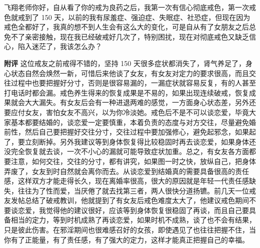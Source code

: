 \begin{case}
    飞翔老师你好，自从看了你的戒为良药之后，我第一次有信心彻底戒色，第一次戒色就戒到了 150 天，以前的我有尿羞症、强迫症、失眠症、社恐症，但现在因为戒色全都好了，我真的想不到人生会有这么大的变化，可是自从有了女朋友之后总免不了亲密接触，现在我已经破戒好几次了，特别困扰，现在对彻底戒色又缺乏信心，陷入迷茫了，我该怎么办？

    \textbf{附评} 这位戒友之前戒得不错的，坚持 150 天很多症状都消失了，肾气养足了，身心状态自然会焕然一新，可惜后来他谈了女友，有女友对定力的要求很高，而且交往过程中也要把握好分寸，否则是很容易漏的，一漏症状就容易反复，有的人甚至打电话时都会漏。戒色养生得来的恢复成果是不易的，如果出现连续破戒，恢复成果就会大大漏失。有女友后会有一种进退两难的感觉，一方面身心状态差，另外还要应付女友，害怕女友不高兴，以为你冷淡她。戒色后不是不可以谈恋爱，毕竟大家基本都要结婚的，谈恋爱一定要慎重，本着负责的态度与对方交往，尽量避免婚前性，然后自己要把握好交往分寸，交往过程中要加强修心，避免起邪念，如果起了，要立刻断掉。另外我建议等到身体恢复得比较稳固时再去谈恋爱，如果身体还没完全恢复就去谈，一次不小心的漏就可能导致症状加重。总之，有女友各方面都要注意，如何交往，交往的分寸，都有讲究，如果图一时之快，放纵自己，把身体弄废了，女友到时自然就会离你而去。从谈恋爱到结婚真的需要具备很高的责任感，这样双方才能走得长久，现在离婚率很高，很大的原因就是年轻一代责任感缺失，往往为了性而爱，当厌倦了就去找第三者，两人很快分道扬镳。前几天一位戒友发帖总结了破戒教训，他就提到了有女友后戒色难度太大了，他建议戒色期间不要谈恋爱，我觉得他的建议很好，应该等到身体恢复很稳固了再谈，而且自己要具备相当的定力，等到时机成熟了再谈恋爱，如果时机不成熟，谈了也不会有结果，只是彼此伤害。在邪淫期间也很难感召好的女孩，即使遇见了也往往把握不住，当你有了正能量，有了责任感，有了强大的定力，这样才能真正把握自己的幸福。
\end{case}

